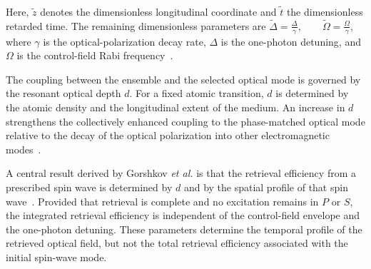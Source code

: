 Here, $\tilde{z}$ denotes the dimensionless longitudinal coordinate and $\tilde{t}$ the dimensionless retarded time. The remaining dimensionless parameters are
$
\tilde{\Delta}=\frac{\Delta}{\gamma},
\qquad
\tilde{\Omega}=\frac{\Omega}{\gamma},
$
where $\gamma$ is the optical-polarization decay rate, $\Delta$ is the one-photon detuning, and $\Omega$ is the control-field Rabi frequency~\cite{PsiL-odamIFm_GorshkovEtAl_2007}.

The coupling between the ensemble and the selected optical mode is governed by the resonant optical depth $d$. For a fixed atomic transition, $d$ is determined by the atomic density and the longitudinal extent of the medium. An increase in $d$ strengthens the collectively enhanced coupling to the phase-matched optical mode relative to the decay of the optical polarization into other electromagnetic modes~\cite{PsiL-odamIFm_GorshkovEtAl_2007}.

A central result derived by Gorshkov \emph{et al.} is that the retrieval efficiency from a prescribed spin wave is determined by $d$ and by the spatial profile of that spin wave~\cite{PsiL-odamIFm_GorshkovEtAl_2007}. Provided that retrieval is complete and no excitation remains in $P$ or $S$, the integrated retrieval efficiency is independent of the control-field envelope and the one-photon detuning. These parameters determine the temporal profile of the retrieved optical field, but not the total retrieval efficiency associated with the initial spin-wave mode.

